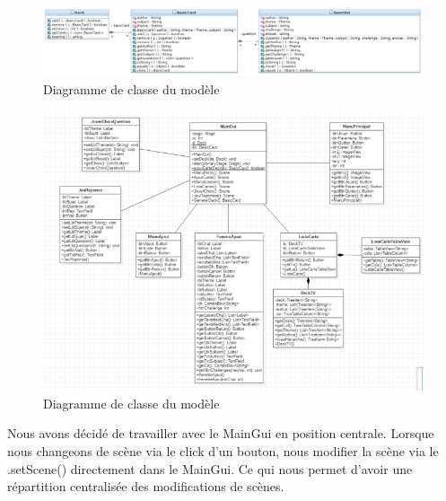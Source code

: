 \begin{figure}[h]
	\centering
	\includegraphics[width=\textwidth]{TTMC_Model_Diagram.png}
	\caption{Diagramme de classe du modèle}
	\label{fig:diag_modele}
\end{figure}

\begin{figure}[h]
	\centering
	\includegraphics[width=\textwidth]{DiagrammeClasseVue.png}
	\caption{Diagramme de classe du modèle}
	\label{fig:diag_modele}
\end{figure}

Nous avons décidé de travailler avec le MainGui en position centrale. Lorsque nous changeons de scène via le click d’un bouton, nous modifier la scène via le .setScene() directement dans le MainGui. Ce qui nous permet d’avoir une répartition centralisée des modifications de scènes.

